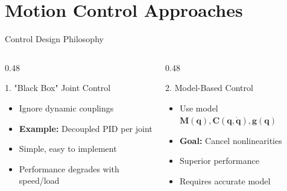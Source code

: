 \documentclass[10pt]{beamer}
\newcommand{\vect}[1]{\boldsymbol{#1}}
\newcommand{\M}{\vect{M}}
\newcommand{\C}{\vect{C}}
\newcommand{\g}{\vect{g}}
\newcommand{\q}{\vect{q}}
\newcommand{\qdot}{\dot{\vect{q}}}
\begin{document}
\section{Motion Control Approaches}
\begin{frame}{Control Design Philosophy}
    \begin{columns}
        \begin{column}{0.48\textwidth}
            \begin{block}{1. "Black Box" Joint Control}
                \begin{itemize}
                    \item Ignore dynamic couplings
                    \item \textbf{Example:} Decoupled PID per joint
                    \item[+] Simple, easy to implement
                    \item[--] Performance degrades with speed/load
                \end{itemize}
            \end{block}
        \end{column}
        
        \begin{column}{0.48\textwidth}
            \begin{block}{2. Model-Based Control}
                \begin{itemize}
                    \item Use model $\M(\q), \C(\q,\qdot), \g(\q)$
                    \item \textbf{Goal:} Cancel nonlinearities
                    \item[+] Superior performance
                    \item[--] Requires accurate model
                \end{itemize}
            \end{block}
        \end{column}
    \end{columns}
    
    \vspace{5mm}
    \begin{center}
    \end{center}
\end{frame}
\end{document}
